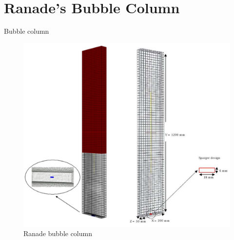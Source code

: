 \documentclass{beamer}
\begin{document}
\section{Ranade's Bubble Column}

\begin{frame}{Bubble column}

  \begin{figure}
  \includegraphics[width=0.3\linewidth]{geometry.png}
  \caption {Ranade bubble column}
  \end{figure}   
\end{frame}
\end{document}
